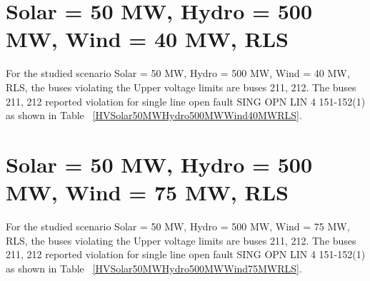 \documentclass[10pt]{report}
\begin{document}
\section{Solar = 50 MW, Hydro = 500 MW, Wind = 40 MW, RLS}
For the studied scenario Solar = 50 MW, Hydro = 500 MW, Wind = 40 MW, RLS, the buses violating the Upper voltage limits are buses 211, 212.
The buses 211, 212 reported violation for single line open fault SING OPN LIN   4 151-152(1) as shown in Table ~\ref{HVSolar50MWHydro500MWWind40MWRLS}.
\begin{table}[H]
\caption{Contingencies reporting bus voltages greater than emergency voltage of 1.1 PU for scenario Solar = 50 MW, Hydro = 500 MW, Wind = 40 MW, RLS}
\label{HVSolar50MWHydro500MWWind40MWRLS}
\centering
{}
\end{table}


\section{Solar = 50 MW, Hydro = 500 MW, Wind = 75 MW, RLS}
For the studied scenario Solar = 50 MW, Hydro = 500 MW, Wind = 75 MW, RLS, the buses violating the Upper voltage limits are buses 211, 212.
The buses 211, 212 reported violation for single line open fault SING OPN LIN   4 151-152(1) as shown in Table ~\ref{HVSolar50MWHydro500MWWind75MWRLS}.
\begin{table}[H]
\caption{Contingencies reporting bus voltages greater than emergency voltage of 1.1 PU for scenario Solar = 50 MW, Hydro = 500 MW, Wind = 75 MW, RLS}
\label{HVSolar50MWHydro500MWWind75MWRLS}
\centering
{}
\end{table}
\end{document}
